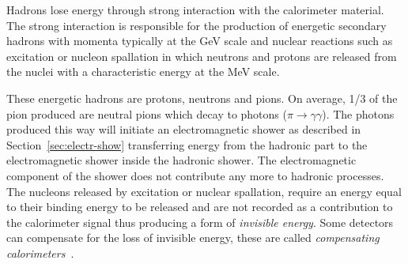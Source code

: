 Hadrons lose energy through strong interaction with the calorimeter
material. The strong interaction is responsible for the production of energetic
secondary hadrons with momenta typically at the GeV scale and nuclear reactions
such as excitation or nucleon spallation in which neutrons and protons are
released from the nuclei with a characteristic energy at the MeV scale.

These energetic hadrons are protons, neutrons and pions. On average, 1/3 of the
pion produced are neutral pions which decay to photons
($\pi \rightarrow \gamma \gamma$). The photons produced this way will initiate
an electromagnetic shower as described in Section~\ref{sec:electr-show}
transferring energy from the hadronic part to the electromagnetic shower inside
the hadronic shower. The electromagnetic component of the shower does not
contribute any more to hadronic processes. The nucleons released by excitation
or nuclear spallation, require an energy equal to their binding energy to be
released and are not recorded as a contribution to the calorimeter signal thus
producing a form of \emph{invisible energy}. Some detectors can compensate for
the loss of invisible energy, these are called \emph{compensating
  calorimeters}~\cite{Calorimetry}.
